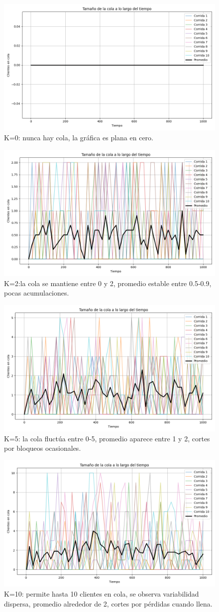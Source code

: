 \documentclass{article}
\begin{document}
\begin{figure}
    \centering
    \includegraphics[width=0.5\linewidth]{Imagenes/MM1/cola_vs_tiempo_0.75_K0.png}
    \caption{K=0: nunca hay cola, la gráfica es plana en cero.}
    \label{fig:enter-label}
\end{figure}
\begin{figure}
    \centering
    \includegraphics[width=0.5\linewidth]{Imagenes/MM1/cola_vs_tiempo_0.75_K2.png}
    \caption{K=2:la cola se mantiene entre 0 y 2, promedio estable entre 0.5‑0.9, pocas acumulaciones.}
    \label{fig:enter-label}
\end{figure}
\begin{figure}
    \centering
    \includegraphics[width=0.5\linewidth]{Imagenes/MM1/cola_vs_tiempo_0.75_K5.png}
    \caption{K=5: la cola fluctúa entre 0‑5, promedio aparece entre 1 y 2, cortes por bloqueos ocasionales.}
    \label{fig:enter-label}
\end{figure}
\begin{figure}
    \centering
    \includegraphics[width=0.5\linewidth]{Imagenes/MM1/cola_vs_tiempo_0.75_K10.png}
    \caption{K=10: permite hasta 10 clientes en cola, se observa variabilidad dispersa, promedio alrededor de 2, cortes por pérdidas cuando llena.}
    \label{fig:enter-label}
\end{figure}
\end{document}
